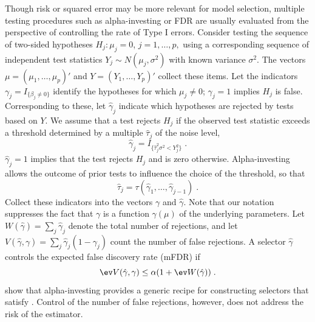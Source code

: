 \documentclass[12pt]{article}
\begin{document}
 Though risk or squared error may be more relevant for model selection, multiple
 testing procedures such as alpha-investing or FDR are usually evaluated from
 the perspective of controlling the rate of Type I errors.  Consider testing the
 sequence of two-sided hypotheses $H_j: \mu_j = 0$, $j = 1,\ldots, p,$ using a
 corresponding sequence of independent test statistics $Y_j \sim N(\mu_j,
 \sigma^2)$ with known variance $\sigma^2$.  The vectors $\mu = (\mu_1, \ldots,
 \mu_p)'$ and $Y = (Y_1, \ldots, Y_p)'$ collect these items.  Let the indicators
 $\gamma_j = I_{\{\beta_j\ne 0\}}$ identify the hypotheses for which $\mu_j \ne
 0$; $\gamma_j = 1$ implies $H_j$ is false.  Corresponding to these, let
 $\hat\gamma_j$ indicate which hypotheses are rejected by tests based on $Y$.
  We assume that a test rejects $H_j$ if the observed test statistic exceeds a
 threshold determined by a multiple $\hat\tau_j$ of the noise level,
 \begin{equation}
    \hat\gamma_j = I_{\{\hat\tau_j^2 \sigma^2 < Y_j^2\}} \;.  
 \label{eq:gammahat}
 \end{equation}
  $\hat\gamma_j = 1$ implies that the test rejects $H_j$ and is zero otherwise.
  Alpha-investing allows the outcome of prior tests to influence the choice of
 the threshold, so that
 \begin{equation}
   \hat\tau_j = \tau(\hat\gamma_1, \ldots, \hat\gamma_{j-1}) \;.   
 \label{eq:tauhat}
 \end{equation}
 Collect these indicators into the vectors $\gamma$ and $\hat\gamma$.  Note that
 our notation suppresses the fact that $\gamma$ is a function $\gamma(\mu)$ of
 the underlying parameters.  Let $W(\hat\gamma) = \sum_j \hat\gamma_j$ denote
 the total number of rejections, and let $V(\hat\gamma, \gamma) = \sum_j
 \hat\gamma_j (1-\gamma_j)$ count the number of false rejections.  A selector
 $\hat\gamma$ controls the expected false discovery rate (mFDR) if
 \begin{equation}
     \ev V(\hat\gamma, \gamma) \le \alpha(1 + \ev W(\hat\gamma)) \;.
 \label{eq:mfdr}
 \end{equation}
 \citet{fosterstine08} show that alpha-investing provides a generic recipe for
 constructing selectors that satisfy .  Control of the number of
 false rejections, however, does not address the risk of the estimator.  
\end{document}
